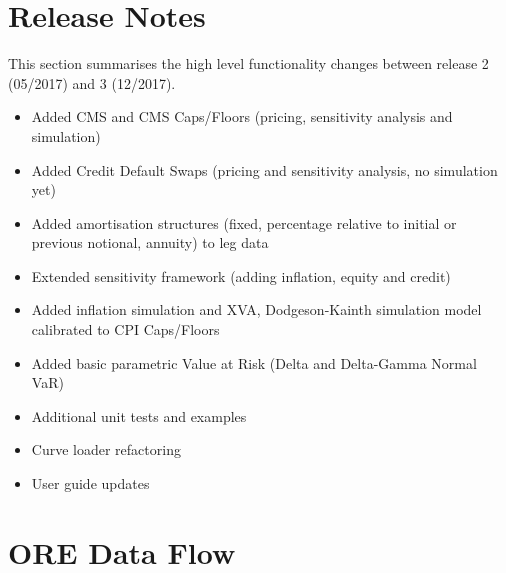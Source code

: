 \documentclass[12pt, a4paper]{article}
\begin{document}
\section{Release Notes}\label{sec:releasenotes}

This section summarises the high level functionality changes between release 2 (05/2017) and 3 (12/2017).

\medskip
\begin{itemize}
\item Added CMS and CMS Caps/Floors (pricing, sensitivity analysis and simulation)
\item Added Credit Default Swaps (pricing and sensitivity analysis, no simulation yet)
\item Added amortisation structures (fixed, percentage relative to initial or previous notional, annuity) to leg data
\item Extended sensitivity framework (adding inflation, equity and credit) 
\item Added inflation simulation and XVA, Dodgeson-Kainth simulation model calibrated to CPI Caps/Floors
\item Added basic parametric Value at Risk (Delta and Delta-Gamma Normal VaR)
\item Additional unit tests and examples
\item Curve loader refactoring
\item User guide updates
\end{itemize}



\section{ORE Data Flow}\label{sec:process}
\end{document}
